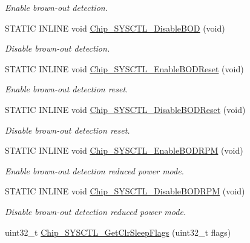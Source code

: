 \begin{DoxyCompactItemize}
\begin{DoxyCompactList}\small\item\em Enable brown-\/out detection. \end{DoxyCompactList}\item 
S\+T\+A\+T\+I\+C I\+N\+L\+I\+N\+E void \hyperlink{group___s_y_s_c_t_l__17_x_x__40_x_x_ga20468997a597d6fcae205472c22a949c}{Chip\+\_\+\+S\+Y\+S\+C\+T\+L\+\_\+\+Disable\+B\+O\+D} (void)
\begin{DoxyCompactList}\small\item\em Disable brown-\/out detection. \end{DoxyCompactList}\item 
S\+T\+A\+T\+I\+C I\+N\+L\+I\+N\+E void \hyperlink{group___s_y_s_c_t_l__17_x_x__40_x_x_ga4b04d78cf397ffd3980b2f4ded6a055d}{Chip\+\_\+\+S\+Y\+S\+C\+T\+L\+\_\+\+Enable\+B\+O\+D\+Reset} (void)
\begin{DoxyCompactList}\small\item\em Enable brown-\/out detection reset. \end{DoxyCompactList}\item 
S\+T\+A\+T\+I\+C I\+N\+L\+I\+N\+E void \hyperlink{group___s_y_s_c_t_l__17_x_x__40_x_x_gaee6f6a45b42962728419d15328427564}{Chip\+\_\+\+S\+Y\+S\+C\+T\+L\+\_\+\+Disable\+B\+O\+D\+Reset} (void)
\begin{DoxyCompactList}\small\item\em Disable brown-\/out detection reset. \end{DoxyCompactList}\item 
S\+T\+A\+T\+I\+C I\+N\+L\+I\+N\+E void \hyperlink{group___s_y_s_c_t_l__17_x_x__40_x_x_ga6fa1a6e737b1ac612ee778894303a270}{Chip\+\_\+\+S\+Y\+S\+C\+T\+L\+\_\+\+Enable\+B\+O\+D\+R\+P\+M} (void)
\begin{DoxyCompactList}\small\item\em Enable brown-\/out detection reduced power mode. \end{DoxyCompactList}\item 
S\+T\+A\+T\+I\+C I\+N\+L\+I\+N\+E void \hyperlink{group___s_y_s_c_t_l__17_x_x__40_x_x_ga758135a9cf9c949acbee97291eb447bf}{Chip\+\_\+\+S\+Y\+S\+C\+T\+L\+\_\+\+Disable\+B\+O\+D\+R\+P\+M} (void)
\begin{DoxyCompactList}\small\item\em Disable brown-\/out detection reduced power mode. \end{DoxyCompactList}\item 
uint32\+\_\+t \hyperlink{group___s_y_s_c_t_l__17_x_x__40_x_x_gab80482c3d12f51ef87131497cb67a326}{Chip\+\_\+\+S\+Y\+S\+C\+T\+L\+\_\+\+Get\+Clr\+Sleep\+Flags} (uint32\+\_\+t flags)

\end{DoxyCompactItemize}
